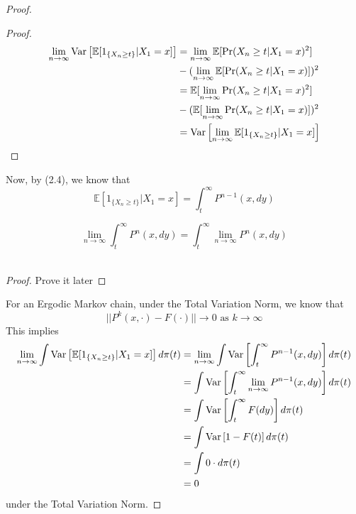 \begin{theorem}
\begin{proof}
\begin{lem}
\begin{proof}
                \begin{align*}
                    \lim_{n \rightarrow \infty} \text{Var}\left[{{\mathbb{E}[1_{\{X_{n} \geq t\}}|X_1=x]}}\right] &= \lim_{n \rightarrow \infty} \mathbb{E}[\Pr(X_{n} \geq t | X_{1} = x)^2]\\
                    &- (\lim_{n \rightarrow \infty} \mathbb{E}[\Pr(X_{n} \geq t | X_{1} = x)])^2\\
                    &= \mathbb{E}[\lim_{n \rightarrow \infty} \Pr(X_{n} \geq t | X_{1} = x)^2]\\
                    &- (\mathbb{E}[\lim_{n \rightarrow \infty}\Pr(X_{n} \geq t | X_{1} = x)])^2\\
                    &= \text{Var}\left[{{\lim_{n \rightarrow \infty} \mathbb{E}[1_{\{X_{n} \geq t\}}|X_1=x]}}\right]
                \end{align*}
            \end{proof}
        \end{lem}
        Now, by (2.4), we know that
        \begin{equation*}
            \mathbb{E}[1_{\{X_{n} \geq t\}}|X_1=x] = \int_t^{\infty} P^{n-1}(x, dy)
        \end{equation*}
        \begin{lem}
            $$\lim_{n \rightarrow \infty} \int_t^{\infty} P^{n}(x, dy) = \int_t^{\infty} \lim_{n \rightarrow \infty} P^{n}(x, dy)$$\
            \begin{proof}
                Prove it later
            \end{proof}
        \end{lem}
        For an Ergodic Markov chain, under the Total Variation Norm, we know that
        \begin{equation*}
            ||P^k(x, \cdot) - F(\cdot)|| \rightarrow 0 \text{ as } k \rightarrow \infty
        \end{equation*}
        This implies
        \begin{align*}
            \lim_{n \rightarrow \infty} \int \text{Var}\left[{{\mathbb{E}[1_{\{X_{n} \geq t\}}|X_1=x]}}\right] d\pi(t) &= \lim_{n \rightarrow \infty} \int \text{Var}\left[{{\int_t^{\infty} P^{n-1}(x, dy)}}\right] d\pi(t)\\
            &= \int \text{Var}\left[{{\int_t^{\infty} \lim_{n \rightarrow \infty} P^{n-1}(x, dy)}}\right] d\pi(t)\\
            &= \int \text{Var}\left[{{\int_t^{\infty} F(dy)}}\right] d\pi(t)\\
            &= \int \text{Var}\left[{{1-F(t)}}\right] d\pi(t)\\
            &= \int 0 \cdot d\pi(t)\\
            &= 0
        \end{align*}
        under the Total Variation Norm.
    \end{proof}
\end{theorem}
